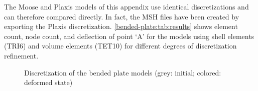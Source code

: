 The Moose and Plaxis models of this appendix use identical discretizations and
can therefore compared directly. In fact, the MSH files have been created by
exporting the Plaxis discretization. \autoref{bended-plate:tab:results} shows
element count, node count, and deflection of point ‘A’ for the models using
shell elements (TRI6) and volume elements (TET10) for different degrees of
discretization refinement.

\begin{figure}[htbp]
    \centering
    \caption{Discretization of the bended plate models (grey: initial; colored: deformed state)}
    \label{bended-plate:fig:discretization}
\end{figure}

